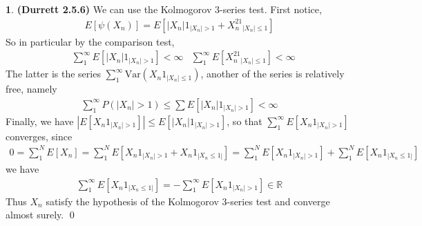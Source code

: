 \documentclass{article}
\theoremstyle{definition}
\newtheorem{pb}{}
\newcommand{\abs}[1]{\left\vert#1\right\vert}
\newcommand{\var}{\text{Var}}
\begin{document}
    \begin{pb}\textbf{(Durrett 2.5.6)}
        We can use the Kolmogorov \(3\)-series test. First notice,
        \begin{align*}
            E[\psi(X_n)] = E\left[\abs{X_n}1_{\abs{X_n} > 1} + X_n^21_{\abs{X_n} \leq 1}\right]
        \end{align*}
        So in particular by the comparison test,
        \begin{align*}
            & \sum_1^\infty E\left[\abs{X_n}1_{\abs{X_n} > 1}\right] < \infty &\sum_1^\infty E\left[X_n^21_{\abs{X_n} \leq 1}\right] < \infty
        \end{align*}
        The latter is the series \(\sum_1^\infty \var(X_n1_{\abs{X_n} \leq 1})\), another of the series is relatively free, namely
        \begin{align*}
            \sum_1^\infty P(\abs{X_n} > 1) \leq \sum E\left[\abs{X_n}1_{\abs{X_n}>1}\right] < \infty
        \end{align*}
        Finally, we have \(\abs{E[X_n1_{\abs{X_n} > 1}]} \leq E\left[\abs{X_n}1_{\abs{X_n} > 1}\right]\), so that \(\sum_1^\infty E\left[X_n1_{\abs{X_n} > 1}\right]\) converges, since
        \begin{align*}
            0 = \sum_1^N E\left[X_n\right] = \sum_1^N E\left[X_n1_{\abs{X_n} > 1} + X_n1_{\abs{X_n \leq 1}}\right] = \sum_1^N E\left[X_n1_{\abs{X_n} > 1}\right] + \sum_1^N E\left[X_n1_{\abs{X_n \leq 1}}\right]
        \end{align*}
        we have
        \begin{align*}
            \sum_1^\infty E\left[X_n1_{\abs{X_n \leq 1}}\right] = - \sum_1^\infty E\left[X_n1_{\abs{X_n} > 1}\right] \in \mathbb{R}
        \end{align*}
        Thus \(X_n\) satisfy the hypothesis of the Kolmogorov \(3\)-series test and converge almost surely. \qed
    \end{pb}
\end{document}
